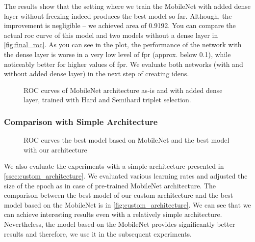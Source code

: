 The results show that the setting where we train the MobileNet with added dense layer without freezing indeed produces the best model so far. Although, the improvement is negligible -- we achieved area of 0.9192. You can compare the actual \gls{roc} curve of this model and two models without a dense layer in \autoref{fig:final_roc}. As you can see in the plot, the performance of the network with the dense layer is worse in a very low level of \gls{fpr} (approx. below 0.1), while noticeably better for higher values of \gls{fpr}. We evaluate both networks (with and without added dense layer) in the next step of creating \glspl{iden}.


\begin{figure}
    \centering
    \def\svgwidth{\columnwidth}
    
    \caption[ROC curves of MobileNet architecture with various alterations]{ROC curves of MobileNet architecture as-is and with added dense layer, trained with Hard and Semihard triplet selection.}
    \label{fig:final_roc}
\end{figure}


\subsubsection{Comparison with Simple Architecture}

\begin{figure}
    \centering
    \def\svgwidth{\columnwidth}
    
    \caption{ROC curves the best model based on MobileNet and the best model with our architecture}
    \label{fig:custom_architecture}
\end{figure}

We also evaluate the experiments with a simple architecture presented in \autoref{ssec:custom_architecture}. We evaluated various learning rates and adjusted the size of the epoch as in case of pre-trained MobileNet architecture. The comparison between the best model of our custom architecture and the best model based on the MobileNet is in \autoref{fig:custom_architecture}. We can see that we can achieve interesting results even with a relatively simple architecture. Nevertheless, the model based on the MobileNet provides significantly better results and therefore, we use it in the subsequent experiments.

